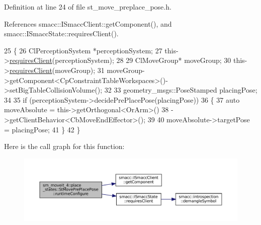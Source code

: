Definition at line 24 of file st\+\_\+move\+\_\+preplace\+\_\+pose.\+h.



References smacc\+::\+I\+Smacc\+Client\+::get\+Component(), and smacc\+::\+I\+Smacc\+State\+::requires\+Client().


\begin{DoxyCode}
25             \{
26                 ClPerceptionSystem *perceptionSystem;
27                 this->\hyperlink{classsmacc_1_1ISmaccState_a7f95c9f0a6ea2d6f18d1aec0519de4ac}{requiresClient}(perceptionSystem);
28 
29                 ClMoveGroup* moveGroup;
30                 this->\hyperlink{classsmacc_1_1ISmaccState_a7f95c9f0a6ea2d6f18d1aec0519de4ac}{requiresClient}(moveGroup);
31                 moveGroup->getComponent<CpConstraintTableWorkspaces>()->setBigTableCollisionVolume();
32 
33                 geometry\_msgs::PoseStamped placingPose;
34 
35                 \textcolor{keywordflow}{if} (perceptionSystem->decidePrePlacePose(placingPose))
36                 \{
37                     \textcolor{keyword}{auto} moveAbsolute = this->getOrthogonal<OrArm>()
38                                             ->getClientBehavior<CbMoveEndEffector>();
39 
40                     moveAbsolute->targetPose = placingPose;
41                 \}
42             \}
\end{DoxyCode}
Here is the call graph for this function\+:
\nopagebreak
\begin{figure}[H]
\begin{center}
\leavevmode
\includegraphics[width=350pt]{structsm__moveit__4_1_1place__states_1_1StMovePrePlacePose_a76aecb88d891dab05216eff868ee4ac7_cgraph}
\end{center}
\end{figure}
\mbox{\label{structsm__moveit__4_1_1place__states_1_1StMovePrePlacePose_afea638295fb6086b4d31c6b64302f2c2}} 
